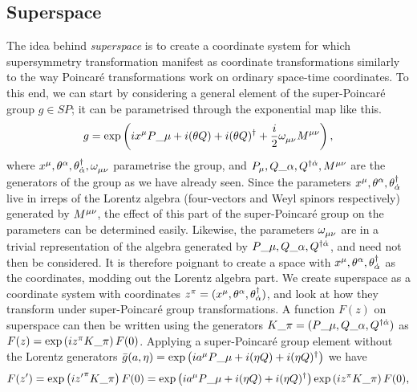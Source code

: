 \documentclass[../main.tex]{subfiles}
\begin{document}
\subsection{Superspace}
The idea behind \emph{superspace} is to create a coordinate system for which supersymmetry transformation manifest as coordinate transformations similarly to the way Poincaré transformations work on ordinary space-time coordinates.
To this end, we can start by considering a general element of the super-Poincaré group \(g \in SP\); it can be parametrised through the exponential map like this.
\begin{equation}
  g = \exptext{ix\^{\mu} P\_{\mu} + i(\theta Q) + i (\theta Q)^\dagger + \frac{i}{2}\tensor{\omega}{_\mu_\nu}\tensor{M}{^\mu^\nu}},
\end{equation}
where \(x^\mu, \theta\^{\alpha}, \theta\indices*{^\dagger_{\dot\alpha}}, \tensor{\omega}{_\mu_\nu}\) parametrise the group, and \(P_\mu, Q\_{\alpha}, Q\indices*{^\dagger^{\dot\alpha}}, \tensor{M}{^\mu^\nu}\) are the generators of the group as we have already seen.
Since the parameters \(x\^{\mu}, \theta\^{\alpha}, \theta\indices*{^\dagger_{\dot\alpha}}\) live in irreps of the Lorentz algebra (four-vectors and Weyl spinors respectively) generated by \(\tensor{M}{^\mu^\nu}\), the effect of this part of the super-Poincaré group on the parameters can be determined easily.
Likewise, the parameters \(\tensor{\omega}{_\mu_\nu}\) are in a trivial representation of the algebra generated by \(P\_{\mu}, Q\_{\alpha}, Q\indices*{^\dagger^{\dot\alpha}}\), and need not then be considered.
It is therefore poignant to create a space with \(x\^{\mu}, \theta\^{\alpha}, \theta\indices*{^\dagger_{\dot\alpha}}\) as the coordinates, modding out the Lorentz algebra part.
We create superspace as a coordinate system with coordinates \(z\^{\pi} = (x\^{\mu}, \theta\^{\alpha}, \theta\indices*{^\dagger_{\dot\alpha}})\), and look at how they transform under super-Poincaré group transformations.
A function \(F(z)\) on superspace can then be written using the generators \(K\_\pi = (P\_\mu, Q\_\alpha, Q\indices*{^\dagger^{\dot\alpha}})\) as \(F(z) = \exptext{iz\^\pi K\_\pi} F(0)\).
Applying a super-Poincaré group element without the Lorentz generators \(\bar{g}(a, \eta) = \exptext{ia\^\mu P\_\mu + i (\eta Q) + i (\eta Q)^\dagger}\) we have
\begin{equation}
  F(z^\prime) = \exptext{i{z^\prime}\^\pi K\_\pi} F(0) = \exptext{ia\^\mu P\_\mu + i (\eta Q) + i (\eta Q)^\dagger} \exptext{iz\^\pi K\_\pi} F(0),
\end{equation}
\end{document}
